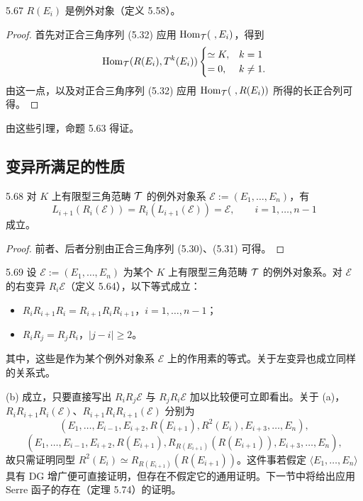 \begin{lemma}{5.67} $R(E_{i})$ 是例外对象（定义 5.58）。\end{lemma}

\begin{proof}
首先对正合三角序列 (5.32) 应用 $\operatorname{Hom}_{\mathcal{T}}(\ ,E_{i})$，得到
\[
  \operatorname{Hom}_{\mathcal{T}}(R(E_{i}),T^{k}(E_{i}))
  \begin{cases}
    \simeq K, & k = 1\\
    = 0, & k \ne 1.
  \end{cases}
\]
由这一点，以及对正合三角序列 (5.32) 应用 $\operatorname{Hom}_{\mathcal{T}}(\ ,R(E_{i}))$ 所得的长正合列可得。
\end{proof}

由这些引理，命题 5.63 得证。

\subsection{变异所满足的性质}

\begin{proposition}{5.68} 对 $K$ 上有限型三角范畴 $\mathcal{T}$ 的例外对象系 $\mathcal{E} := (E_{1},\ldots,E_{n})$，有
\begin{equation}
  L_{i+1}(R_{i}(\mathcal{E})) = R_{i}(L_{i+1}(\mathcal{E})) = \mathcal{E},
  \qquad i = 1,\ldots,n-1 \tag{5.34}
\end{equation}
成立。\end{proposition}

\begin{proof}
前者、后者分别由正合三角序列 (5.30)、(5.31) 可得。
\end{proof}

\begin{proposition}{5.69} 设 $\mathcal{E} := (E_{1},\ldots,E_{n})$ 为某个 $K$ 上有限型三角范畴 $\mathcal{T}$ 的例外对象系。对 $\mathcal{E}$ 的右变异 $R_{i}\mathcal{E}$（定义 5.64），以下等式成立：
\begin{itemize}
  \item[(a)] $R_{i}R_{i+1}R_{i} = R_{i+1}R_{i}R_{i+1}$，\quad $i = 1,\ldots,n-1$；
  \item[(b)] $R_{i}R_{j} = R_{j}R_{i}$，\quad $|j-i| \ge 2$。
\end{itemize}
其中，这些是作为某个例外对象系 $\mathcal{E}$ 上的作用素的等式。关于左变异也成立同样的关系式。\end{proposition}

(b) 成立，只要直接写出 $R_{i}R_{j}\mathcal{E}$ 与 $R_{j}R_{i}\mathcal{E}$ 加以比较便可立即看出。关于 (a)，$R_{i}R_{i+1}R_{i}(\mathcal{E})$、$R_{i+1}R_{i}R_{i+1}(\mathcal{E})$ 分别为
\[
  (E_{1},\ldots,E_{i-1},E_{i+2},R(E_{i+1}),R^{2}(E_{i}),E_{i+3},\ldots,E_{n}),
\]
\[
  (E_{1},\ldots,E_{i-1},E_{i+2},R(E_{i+1}),R_{R(E_{i+1})}(R(E_{i+1})),E_{i+3},\ldots,E_{n}),
\]
故只需证明同型 $R^{2}(E_{i}) \simeq R_{R(E_{i+1})}(R(E_{i+1}))$。这件事若假定 $\langle E_{1},\ldots,E_{n}\rangle$ 具有 DG 增广便可直接证明，但存在不假定它的通用证明。下一节中将给出应用 Serre 函子的存在（定理 5.74）的证明。

